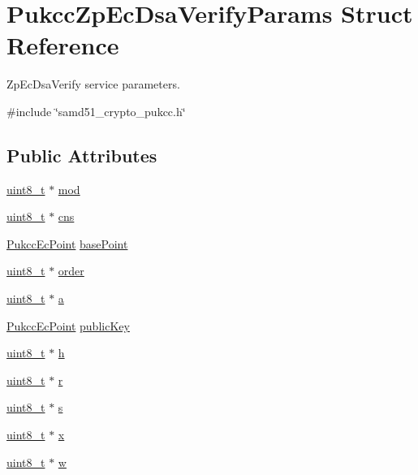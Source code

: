 \hypertarget{structPukccZpEcDsaVerifyParams}{}\section{Pukcc\+Zp\+Ec\+Dsa\+Verify\+Params Struct Reference}
\label{structPukccZpEcDsaVerifyParams}


Zp\+Ec\+Dsa\+Verify service parameters.  




{\ttfamily \#include \char`\"{}samd51\+\_\+crypto\+\_\+pukcc.\+h\char`\"{}}

\subsection*{Public Attributes}
\begin{DoxyCompactItemize}
\item 
\hyperlink{stdint_8h_aba7bc1797add20fe3efdf37ced1182c5}{uint8\+\_\+t} $\ast$ \hyperlink{structPukccZpEcDsaVerifyParams_ab5497524c8736848d2ad4684f30383d8}{mod}
\item 
\hyperlink{stdint_8h_aba7bc1797add20fe3efdf37ced1182c5}{uint8\+\_\+t} $\ast$ \hyperlink{structPukccZpEcDsaVerifyParams_aadd1ae7fc5a7896987eabf923ae03cbe}{cns}
\item 
\hyperlink{structPukccEcPoint}{Pukcc\+Ec\+Point} \hyperlink{structPukccZpEcDsaVerifyParams_a2ac5ccd3dff517eada95c413132f45a4}{base\+Point}
\item 
\hyperlink{stdint_8h_aba7bc1797add20fe3efdf37ced1182c5}{uint8\+\_\+t} $\ast$ \hyperlink{structPukccZpEcDsaVerifyParams_acb7fa19dc53f55a40127565dab56851d}{order}
\item 
\hyperlink{stdint_8h_aba7bc1797add20fe3efdf37ced1182c5}{uint8\+\_\+t} $\ast$ \hyperlink{structPukccZpEcDsaVerifyParams_afd880dd25731dede8f814a0b23ca7c76}{a}
\item 
\hyperlink{structPukccEcPoint}{Pukcc\+Ec\+Point} \hyperlink{structPukccZpEcDsaVerifyParams_a00dc7a9a7dd8a3ff055a2b6cd79d5907}{public\+Key}
\item 
\hyperlink{stdint_8h_aba7bc1797add20fe3efdf37ced1182c5}{uint8\+\_\+t} $\ast$ \hyperlink{structPukccZpEcDsaVerifyParams_a9681bbb92e694fedbf43187ecf9901a4}{h}
\item 
\hyperlink{stdint_8h_aba7bc1797add20fe3efdf37ced1182c5}{uint8\+\_\+t} $\ast$ \hyperlink{structPukccZpEcDsaVerifyParams_a8023f1b83123f175eba92c43df1b84d5}{r}
\item 
\hyperlink{stdint_8h_aba7bc1797add20fe3efdf37ced1182c5}{uint8\+\_\+t} $\ast$ \hyperlink{structPukccZpEcDsaVerifyParams_a573aa7ef095778e92f93c07b79a77c55}{s}
\item 
\hyperlink{stdint_8h_aba7bc1797add20fe3efdf37ced1182c5}{uint8\+\_\+t} $\ast$ \hyperlink{structPukccZpEcDsaVerifyParams_a7ade27e4f2d94397ec5b80f91eaa7854}{x}
\item 
\hyperlink{stdint_8h_aba7bc1797add20fe3efdf37ced1182c5}{uint8\+\_\+t} $\ast$ \hyperlink{structPukccZpEcDsaVerifyParams_a31f84c1a1e5b1918691c76eeda448dda}{w}
\end{DoxyCompactItemize}


